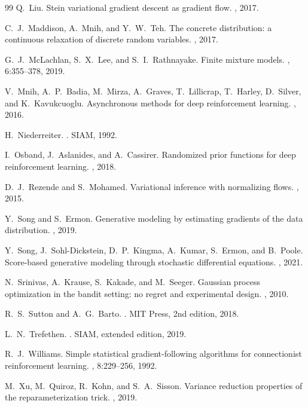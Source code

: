 \documentclass[11pt,a4paper]{article}
\begin{document}
\begin{thebibliography}{99}
Q.~Liu.
\newblock Stein variational gradient descent as gradient flow.
, 2017.

C.~J.~Maddison, A.~Mnih, and Y.~W.~Teh.
\newblock The concrete distribution: a continuous relaxation of discrete
         random variables.
, 2017.

G.~J.~McLachlan, S.~X.~Lee, and S.~I.~Rathnayake.
\newblock Finite mixture models.
,
         6:355--378, 2019.

V.~Mnih, A.~P.~Badia, M.~Mirza, A.~Graves, T.~Lillicrap, T.~Harley,
D.~Silver, and K.~Kavukcuoglu.
\newblock Asynchronous methods for deep reinforcement learning.
, 2016.

H.~Niederreiter.
.
\newblock SIAM, 1992.

I.~Osband, J.~Aslanides, and A.~Cassirer.
\newblock Randomized prior functions for deep reinforcement learning.
, 2018.

D.~J.~Rezende and S.~Mohamed.
\newblock Variational inference with normalizing flows.
, 2015.

Y.~Song and S.~Ermon.
\newblock Generative modeling by estimating gradients of the data
         distribution.
, 2019.

Y.~Song, J.~Sohl-Dickstein, D.~P.~Kingma, A.~Kumar, S.~Ermon, and
B.~Poole.
\newblock Score-based generative modeling through stochastic differential
         equations.
, 2021.

N.~Srinivas, A.~Krause, S.~Kakade, and M.~Seeger.
\newblock Gaussian process optimization in the bandit setting: no regret
         and experimental design.
, 2010.

R.~S.~Sutton and A.~G.~Barto.
.
\newblock MIT Press, 2nd edition, 2018.

L.~N.~Trefethen.
.
\newblock SIAM, extended edition, 2019.

R.~J.~Williams.
\newblock Simple statistical gradient-following algorithms for
         connectionist reinforcement learning.
, 8:229--256, 1992.

M.~Xu, M.~Quiroz, R.~Kohn, and S.~A.~Sisson.
\newblock Variance reduction properties of the reparameterization trick.
, 2019.

\end{thebibliography}
\end{document}
